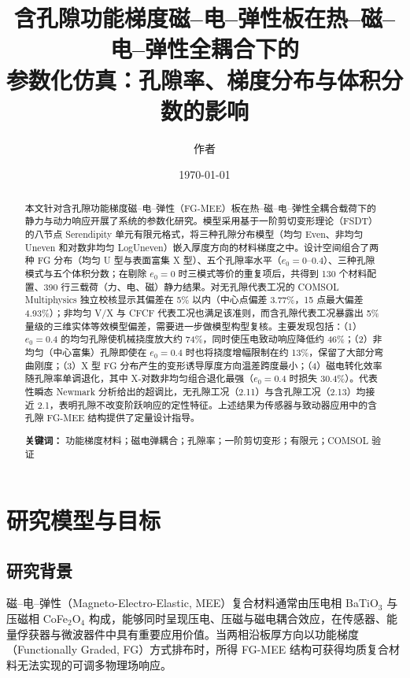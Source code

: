 \documentclass[11pt,a4paper]{ctexart}
\title{\textbf{含孔隙功能梯度磁--电--弹性板在热--磁--电--弹性全耦合下的\\参数化仿真：孔隙率、梯度分布与体积分数的影响}}
\author{作者}
\date{\today}
\begin{document}
\maketitle

\begin{abstract}
本文针对含孔隙功能梯度磁--电--弹性（FG-MEE）板在热--磁--电--弹性全耦合载荷下的静力与动力响应开展了系统的参数化研究。模型采用基于一阶剪切变形理论（FSDT）的八节点 Serendipity 单元有限元格式，将三种孔隙分布模型（均匀 Even、非均匀 Uneven 和对数非均匀 LogUneven）嵌入厚度方向的材料梯度之中。设计空间组合了两种 FG 分布（均匀 U 型与表面富集 X 型）、五个孔隙率水平（$e_0 = 0$--$0.4$）、三种孔隙模式与五个体积分数；在剔除 $e_0 = 0$ 时三模式等价的重复项后，共得到 130 个材料配置、390 行三载荷（力、电、磁）静力结果。对无孔隙代表工况的 COMSOL Multiphysics 独立校核显示其偏差在 5\% 以内（中心点偏差 3.77\%，15 点最大偏差 4.93\%）；非均匀 V/X 与 CFCF 代表工况也满足该准则，而含孔隙代表工况暴露出 5\% 量级的三维实体等效模型偏差，需要进一步做模型构型复核。主要发现包括：（1）$e_0 = 0.4$ 的均匀孔隙使机械挠度放大约 74\%，同时使压电致动响应降低约 46\%；（2）非均匀（中心富集）孔隙即使在 $e_0 = 0.4$ 时也将挠度增幅限制在约 13\%，保留了大部分弯曲刚度；（3）X 型 FG 分布产生的变形诱导厚度方向温差跨度最小；（4）磁电转化效率随孔隙率单调退化，其中 X-对数非均匀组合退化最强（$e_0 = 0.4$ 时损失 30.4\%）。代表性瞬态 Newmark 分析给出的超调比，无孔隙工况（2.11）与含孔隙工况（2.13）均接近 2.1，表明孔隙不改变阶跃响应的定性特征。上述结果为传感器与致动器应用中的含孔隙 FG-MEE 结构提供了定量设计指导。

\medskip
\noindent\textbf{关键词：} 功能梯度材料；磁电弹耦合；孔隙率；一阶剪切变形；有限元；COMSOL 验证
\end{abstract}

\tableofcontents
\newpage

\section{研究模型与目标}

\subsection{研究背景}

磁--电--弹性（Magneto-Electro-Elastic, MEE）复合材料通常由压电相 BaTiO$_3$ 与压磁相 CoFe$_2$O$_4$ 构成，能够同时呈现压电、压磁与磁电耦合效应，在传感器、能量俘获器与微波器件中具有重要应用价值。当两相沿板厚方向以功能梯度（Functionally Graded, FG）方式排布时，所得 FG-MEE 结构可获得均质复合材料无法实现的可调多物理场响应。
\end{document}
